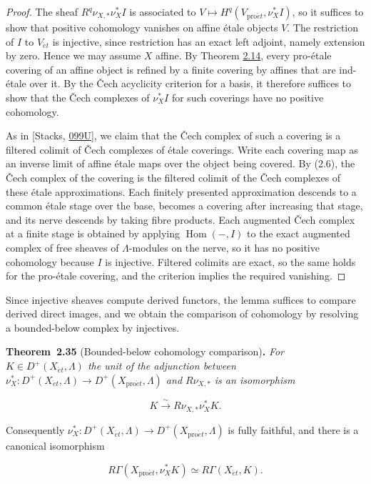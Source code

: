 \documentclass[11pt]{article}
\newenvironment{bpstatement}[2]{\par\addvspace{0.6\baselineskip}\noindent\textbf{#1}#2\textbf{.}\enspace\ignorespaces}
  {\par\addvspace{0.4\baselineskip}}
\newenvironment{bpstatementit}[2]{\begin{bpstatement}{#1}{#2}\itshape\ignorespaces}{\end{bpstatement}}
\providecommand{\Hom}{}\renewcommand{\Hom}{\operatorname{Hom}}
\begin{document}
\begin{proof}[{Proof}]\label{bp101}%
The sheaf \(R^q\nu_{X,*}\nu_X^*I\) is associated to \(V\mapsto H^q(V_{\mathrm{pro}\acute{e}t},\nu_X^*I)\), so it suffices to show that positive cohomology vanishes on affine étale objects \(V\). The restriction of \(I\) to \(V_{\acute{e}t}\) is injective, since restriction has an exact left adjoint, namely extension by zero. Hence we may assume \(X\) affine. By Theorem \hyperref[bp42]{2.14}, every pro-étale covering of an affine object is refined by a finite covering by affines that are ind-étale over it. By the Čech acyclicity criterion for a basis, it therefore suffices to show that the Čech complexes of \(\nu_X^*I\) for such coverings have no positive cohomology.

As in [Stacks, \href{https://stacks.math.columbia.edu/tag/099U}{099U}], we claim that the Čech complex of such a covering is a filtered colimit of Čech complexes of étale coverings. Write each covering map as an inverse limit of affine étale maps over the object being covered. By (2.6), the Čech complex of the covering is the filtered colimit of the Čech complexes of these étale approximations. Each finitely presented approximation descends to a common étale stage over the base, becomes a covering after increasing that stage, and its nerve descends by taking fibre products. Each augmented Čech complex at a finite stage is obtained by applying \(\Hom(-,I)\) to the exact augmented complex of free sheaves of \(\Lambda\)-modules on the nerve, so it has no positive cohomology because \(I\) is injective. Filtered colimits are exact, so the same holds for the pro-étale covering, and the criterion implies the required vanishing.
\end{proof}

\label{bp102}%
Since injective sheaves compute derived functors, the lemma suffices to compare derived direct images, and we obtain the comparison of cohomology by resolving a bounded-below complex by injectives.

\label{bp103}%
\begin{bpstatementit}{Theorem~2.35}{ (Bounded-below cohomology comparison)}
For \(K\in D^+(X_{\acute{e}t},\Lambda)\) the unit of the adjunction between \(\nu_X^*:D^+(X_{\acute{e}t},\Lambda)\to D^+(X_{\mathrm{pro}\acute{e}t},\Lambda)\) and \(R\nu_{X,*}\) is an isomorphism

\[
K\xrightarrow{\ \sim\ }R\nu_{X,*}\nu_X^*K.
\tag{2.7}
\]

Consequently \(\nu_X^*:D^+(X_{\acute{e}t},\Lambda)\to D^+(X_{\mathrm{pro}\acute{e}t},\Lambda)\) is fully faithful, and there is a canonical isomorphism

\[
R\Gamma(X_{\mathrm{pro}\acute{e}t},\nu_X^*K)
\simeq R\Gamma(X_{\acute{e}t},K).
\]
\end{bpstatementit}
\end{document}
